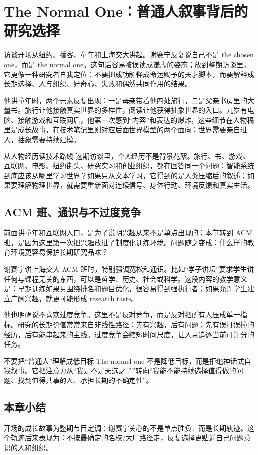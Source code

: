 \section{The Normal One：普通人叙事背后的研究选择}

访谈开场从纽约、播客、童年和上海交大讲起。谢赛宁反复说自己不是 the chosen one，而是 the normal one。这句话容易被误读成谦虚的姿态；放到整期访谈里，它更像一种研究者自我定位：不要把成功解释成命运赐予的天才脚本，而要解释成长期选择、人与组织、好奇心、失败和偶然共同作用的结果。

他讲童年时，两个元素反复出现：一是母亲带着他四处旅行，二是父亲书房里的大量书。旅行让他接触真实世界的多样性，阅读让他获得抽象世界的入口。九岁有电脑、接触游戏和互联网后，他第一次感到“内容”和表达的爆炸。这些细节在人物稿里是成长故事，在技术笔记里则对应后面世界模型的两个面向：世界需要亲自进入，抽象需要持续建模。

\begin{knowledgebox}{从人物经历读技术路线}
这期访谈里，个人经历不是背景花絮。旅行、书、游戏、互联网、电影、纽约街头、研究实习和创业组织，都在回答同一个问题：智能系统到底应该从哪里学习世界？如果只从文本学习，它得到的是人类压缩后的叙述；如果要理解物理世界，就需要重新面对连续信号、身体行动、环境反馈和真实生活。
\end{knowledgebox}

\subsection{ACM 班、通识与不过度竞争}

前面讲童年和互联网入口，是为了说明兴趣从来不是单点出现的；本节转到 ACM 班，是因为这里第一次把兴趣放进了制度化训练环境。问题随之变成：什么样的教育环境更容易保护长期研究品味？

谢赛宁讲上海交大 ACM 班时，特别强调宽松和通识。比如“学子讲坛”要求学生讲任何与课程无关的东西，可以是哲学、历史、社会或科学。这段内容的教学意义是：早期训练如果只围绕排名和题目优化，很容易得到强执行者；如果允许学生建立广阔兴趣，就更可能形成 research taste。

他也明确说不喜欢过度竞争。这里不是反对竞争，而是反对把所有人压成单一指标。研究的长期价值常常来自非线性路径：先有兴趣，后有问题；先有误打误撞的经历，后有能串起来的主线。过度竞争会缩短时间尺度，让人只追逐当前可计分的任务。

\begin{warningbox}{不要把“普通人”理解成低目标}
The normal one 不是降低目标，而是拒绝神话式自我叙事。它把注意力从“我是不是天选之子”转向“我能不能持续选择值得做的问题、找到值得共事的人、承担长期的不确定性”。
\end{warningbox}

\subsection{本章小结}

开场的成长故事为整期节目定调：谢赛宁关心的不是单点胜负，而是长期轨迹。这个轨迹后来表现为：不按最确定的名校/大厂路径走，反复选择更贴近自己问题意识的人和组织。

